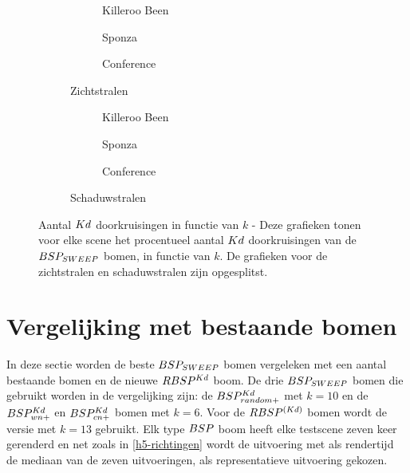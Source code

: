 \begin{figure}
  \centering
  \begin{subfigure}{\linewidth}
  \centering
  \begin{subfigure}[t]{.32\linewidth}
    \centering
{}
\caption{Killeroo Been}
  \end{subfigure}
  \begin{subfigure}[t]{.32\linewidth}
    \centering
{}
\caption{Sponza}
\end{subfigure}
\begin{subfigure}[t]{.32\linewidth}
  \centering
{}
\caption{Conference}
\end{subfigure}
\caption{Zichtstralen}
\end{subfigure}
\begin{subfigure}{\linewidth}
  \centering
  \begin{subfigure}[t]{.32\linewidth}
    \centering
{}
\caption{Killeroo Been}
  \end{subfigure}
  \begin{subfigure}[t]{.32\linewidth}
    \centering
{}
\caption{Sponza}
\end{subfigure}
\begin{subfigure}[t]{.32\linewidth}
  \centering
{}
\caption{Conference}
\end{subfigure}
\caption{Schaduwstralen}
\end{subfigure}
\caption[Aantal $\symKd$ doorkruisingen in functie van $k$]{Aantal $\symKd$ doorkruisingen in functie van $k$ - \small Deze grafieken tonen voor elke scene het procentueel aantal $\symKd$ doorkruisingen van de $BSP_{SWEEP}$ bomen, in functie van $k$. De grafieken voor de zichtstralen en schaduwstralen zijn opgesplitst.}
\label{fig:k-kd-doorkruisingen-prec}
\end{figure}


\section{Vergelijking met bestaande bomen}
\label{h5-vergelijken}
In deze sectie worden de beste $BSP_{SWEEP}$ bomen vergeleken met een aantal bestaande bomen en de nieuwe $RBSP^{Kd}$ boom.
De drie $BSP_{SWEEP}$ bomen die gebruikt worden in de vergelijking zijn: de $BSP^{Kd}_{random+}$ met $k = 10$ en de $BSP^{Kd}_{wn+}$ en $BSP^{Kd}_{cn+}$ bomen met $k = 6$.
Voor de $RBSP^{(Kd)}$ bomen wordt de versie met $k = 13$ gebruikt.
Elk type $BSP$ boom heeft elke testscene zeven keer gerenderd en net zoals in \ref{h5-richtingen} wordt de uitvoering met als rendertijd de mediaan van de zeven uitvoeringen, als representatieve uitvoering gekozen.

